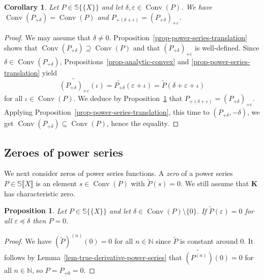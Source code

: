 \documentclass{article}
\newcommand{\tmem}[1]{{\em #1\/}}
\newcommand{\tmop}[1]{\ensuremath{\operatorname{#1}}}
\newtheorem{corollary}[theorem]{Corollary}
\newtheorem{proposition}[theorem]{Proposition}
\theoremstyle{remark}\newtheorem*{convention*}{Convention}
\begin{document}
\begin{corollary}
  \label{cor-power-series-translation}Let $P \in \mathbb{S} \{ \!\! \{X\} \!\!
  \}$ and let $\delta, \varepsilon \in \tmop{Conv} (P)$. We have $\tmop{Conv}
  (P_{+ \delta}) = \tmop{Conv} (P)$ and $P_{+ (\delta + \varepsilon)} = (P_{+
  \delta})_{+ \varepsilon}$.
\end{corollary}

\begin{proof}
  We may assume that $\delta \neq 0$.
  Proposition~\ref{prop-power-series-translation} shows that $\tmop{Conv}
  (P_{+ \delta}) \supseteq \tmop{Conv} (P)$ and that $(P_{+ \delta})_{+
  \varepsilon}$ is well-defined. Since $\delta \in \tmop{Conv} (P_{+
  \delta})$, Propositions~\ref{prop-analytic-convex} and
  \ref{prop-power-series-translation} yield
  \[ \widetilde{(P_{+ \delta})_{+ \varepsilon}} (\iota) = \widetilde{P_{+
     \delta}} (\varepsilon + \iota) = \tilde{P} (\delta + \varepsilon + \iota)
  \]
  for all $\iota \in \tmop{Conv} (P)$. We deduce by
  Proposition~\ref{prop-lifting-inequalities} that $P_{+ (\delta + \varepsilon)} = (P_{+
  \delta})_{+ \varepsilon}$. Applying
  Proposition~\ref{prop-power-series-translation}, this time to $(P_{+
  \delta}, - \delta)$, we get $\tmop{Conv} (P_{+ \delta}) \subseteq
  \tmop{Conv} (P)$, hence the equality.
\end{proof}

\subsection{Zeroes of power series}

We next consider zeros of power series functions. A {\tmem{zero}}{} of a power series $P \in \mathbb{S} \llbracket X
\rrbracket$ is an element $s \in \tmop{Conv} (P)$ with $\tilde{P} (s) = 0$. We
still assume that $\mathbf{K}$ has characteristic zero.

\begin{proposition}
  \label{prop-lifting-inequalities}Let $P \in \mathbb{S} \{ \!\! \{X\} \!\!
  \}$ and let $\delta \in \tmop{Conv} (P) \setminus \{0\}$. If $\tilde{P}
  (\varepsilon) = 0$ for all $\varepsilon \preccurlyeq \delta$ then $P = 0$.
\end{proposition}

\begin{proof}
  We have $(\tilde{P})^{(n)} (0) = 0$ for all $n \in \mathbb{N}$ since
  $\tilde{P}$ is constant around $0$. It follows by
  Lemma~\ref{lem-true-derivative-power-series} that $\widetilde{(P^{(n)})} (0) = 0$
  for all $n \in \mathbb{N}$, so $P = P_{+ 0} = 0$.\end{proof}
\end{document}
